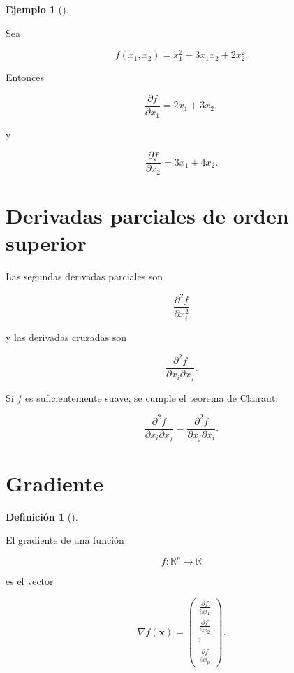 \documentclass[
  spanish,
  10.5pt,
  letterpaper,
  DIV=11,
  numbers=noendperiod,
  oneside,
  open=any]{scrreprt}
\theoremstyle{definition}
\newtheorem{definition}{Definición}[chapter]
\theoremstyle{definition}
\newtheorem{example}{Ejemplo}[chapter]
\theoremstyle{plain}
\theoremstyle{remark}
\begin{document}
\begin{example}[]\protect\hypertarget{exm-derivadas-parciales}{}\label{exm-derivadas-parciales}

Sea

\[
f(x_1,x_2)
=
x_1^2+3x_1x_2+2x_2^2.
\]

Entonces

\[
\frac{\partial f}{\partial x_1}
=
2x_1+3x_2,
\]

y

\[
\frac{\partial f}{\partial x_2}
=
3x_1+4x_2.
\]

\end{example}

\section*{Derivadas parciales de orden
superior}\label{derivadas-parciales-de-orden-superior}


Las segundas derivadas parciales son

\[
\frac{\partial^2 f}{\partial x_i^2}
\]

y las derivadas cruzadas son

\[
\frac{\partial^2 f}
{\partial x_i\partial x_j}.
\]

Si \(f\) es suficientemente suave, se cumple el teorema de Clairaut:

\[
\frac{\partial^2 f}
{\partial x_i\partial x_j}
=
\frac{\partial^2 f}
{\partial x_j\partial x_i}.
\]

\section*{Gradiente}\label{gradiente}


\begin{definition}[]\protect\hypertarget{def-gradiente}{}\label{def-gradiente}

El gradiente de una función

\[
f:\mathbb{R}^{p}\to\mathbb{R}
\]

es el vector

\[
\nabla f(\mathbf{x})
=
\begin{pmatrix}
\frac{\partial f}{\partial x_1}\\
\frac{\partial f}{\partial x_2}\\
\vdots\\
\frac{\partial f}{\partial x_p}
\end{pmatrix}.
\]

\end{definition}
\end{document}
